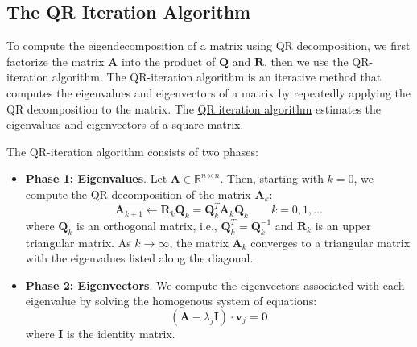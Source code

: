 \documentclass{article}[11pt]
\begin{document}
\subsection{The QR Iteration Algorithm}
To compute the eigendecomposition of a matrix using QR decomposition, we first factorize the matrix $\mathbf{A}$ into the product of $\mathbf{Q}$ and $\mathbf{R}$, 
then we use the QR-iteration algorithm. The QR-iteration algorithm is an iterative method that computes the eigenvalues and eigenvectors of a matrix by repeatedly applying the QR decomposition to the matrix.
The \href{https://en.wikipedia.org/wiki/QR_algorithm}{QR iteration algorithm} estimates the eigenvalues and eigenvectors of a square matrix.
\begin{mdframed}
The QR-iteration algorithm consists of two phases:
\begin{itemize}[leftmargin=16pt]
\item{\textbf{Phase 1: Eigenvalues}. Let $\mathbf{A}\in\mathbb{R}^{n\times{n}}$. 
Then, starting with $k = 0$, we compute the \href{https://en.wikipedia.org/wiki/QR_decomposition}{QR decomposition} of the matrix $\mathbf{A}_{k}$:
\begin{equation*}
\mathbf{A}_{k+1}\leftarrow\mathbf{R}_{k}\mathbf{Q}_{k} = \mathbf{Q}_{k}^{T}\mathbf{A}_{k}\mathbf{Q}_{k}\qquad{k=0,1,\dots} 
\end{equation*}
where $\mathbf{Q}_{k}$ is an orthogonal matrix, i.e., $\mathbf{Q}^{T}_{k} = \mathbf{Q}^{-1}_{k}$ and $\mathbf{R}_{k}$ is an upper triangular matrix. 
As $k\rightarrow\infty$, the matrix $\mathbf{A}_{k}$ converges to a triangular matrix with the eigenvalues listed along the diagonal.}
\item{\textbf{Phase 2: Eigenvectors}. We compute the eigenvectors associated with each eigenvalue by solving the homogenous system of equations:
\begin{equation*}
\left(\mathbf{A}-\lambda_{j}\mathbf{I}\right)\cdot\mathbf{v}_{j} = \mathbf{0}
\end{equation*}
where $\mathbf{I}$ is the identity matrix.}
\end{itemize}
\end{mdframed}
\end{document}

